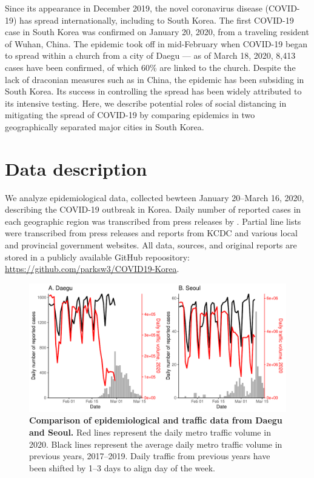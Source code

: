\documentclass[12pt]{article}
\date{\today}
\begin{document}
\begin{flushleft}{
	\Large
	\textbf{}
}
\end{flushleft}

\pagebreak

Since its appearance in December 2019, the novel coronavirus disease (COVID-19) has spread internationally, including to South Korea.
The first COVID-19 case in South Korea was confirmed on January 20, 2020, from a traveling resident of Wuhan, China.
The epidemic took off in mid-February when COVID-19 began to spread within a church from a city of Daegu --- as of March 18, 2020, 8,413 cases have been confirmed, of which 60\% are linked to the church.
Despite the lack of draconian measures such as in China, the epidemic has been subsiding in South Korea.
Its success in controlling the spread has been widely attributed to its intensive testing.
Here, we describe potential roles of social distancing in mitigating the spread of COVID-19 by comparing epidemics in two geographically separated major cities in South Korea.

\section{Data description}

We analyze epidemiological data, collected bewteen January 20--March 16, 2020, describing the COVID-19 outbreak in Korea.
Daily number of reported cases in each geographic region was transcribed from press releases by \cite{kcdc}.
Partial line lists were transcribed from press releases and reports from KCDC and various local and provincial government websites.
All data, sources, and original reports are stored in a publicly available GitHub repoository: \url{https://github.com/parksw3/COVID19-Korea}.

\begin{figure}[!h]
\includegraphics[width=\textwidth]{figure_compare_report.pdf}
\caption{
\textbf{Comparison of epidemiological and traffic data from Daegu and Seoul.}
Red lines represent the daily metro traffic volume in 2020.
Black lines represent the average daily metro traffic volume in previous years, 2017--2019.
Daily traffic from previous years have been shifted by 1--3 days to align day of the week.
}
\label{fig:data}
\end{figure}
\end{document}
